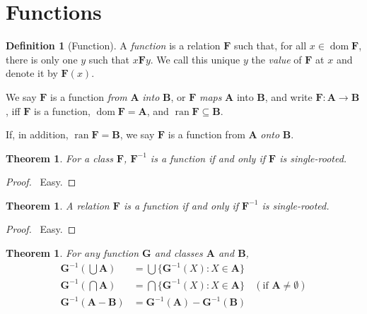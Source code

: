 \documentclass{article}
\let\qed\relax
\newtheorem{theorem}[axiom]{Theorem}
\theoremstyle{definition}
\newtheorem{definition}[axiom]{Definition}
\newcommand{\dom}{\ensuremath{\operatorname{dom}}}
\newcommand{\inv}[1]{\ensuremath{{#1}^{-1}}}
\newcommand{\ran}{\ensuremath{\operatorname{ran}}}
\begin{document}
    \section{Functions}

    \begin{definition}[Function]
        A \emph{function} is a relation $\mathbf{F}$ such that, for all $x \in \dom \mathbf{F}$,
        there is only one $y$ such that $x \mathbf{F} y$. We call this unique $y$ the \emph{value}
        of $\mathbf{F}$ at $x$ and denote it by $\mathbf{F}(x)$.

        We say $\mathbf{F}$ is a function \emph{from} $\mathbf{A}$ \emph{into} $\mathbf{B}$,
        or $\mathbf{F}$ \emph{maps} $\mathbf{A}$ into $\mathbf{B}$, and write $\mathbf{F} : \mathbf{A}
        \rightarrow \mathbf{B}$, iff $\mathbf{F}$ is a function, $\dom \mathbf{F} = \mathbf{A}$,
        and $\ran \mathbf{F} \subseteq \mathbf{B}$.

        If, in addition, $\ran \mathbf{F} = \mathbf{B}$, we say $\mathbf{F}$ is a function from $\mathbf{A}$
        \emph{onto} $\mathbf{B}$.
    \end{definition}

    \begin{theorem}
        For a class $\mathbf{F}$, $\inv{\mathbf{F}}$ is a function if and only if $\mathbf{F}$ is single-rooted.
    \end{theorem}

    \begin{proof}
        \pf\ Easy. \qed
    \end{proof}

    \begin{theorem}
        A relation $\mathbf{F}$ is a function if and only if $\inv{\mathbf{F}}$ is single-rooted.
    \end{theorem}

    \begin{proof}
        \pf\ Easy. \qed
    \end{proof}

    \begin{theorem}
        For any function $\mathbf{G}$ and classes $\mathbf{A}$ and $\mathbf{B}$,
        \begin{align*}
            \inv{\mathbf{G}}(\bigcup \mathbf{A}) & = \bigcup \{ \inv{\mathbf{G}}(X) : X \in \mathbf{A} \} \\
            \inv{\mathbf{G}}(\bigcap \mathbf{A}) & = \bigcap \{ \inv{\mathbf{G}}(X) : X \in \mathbf{A} \} &
            (\text{if } \mathbf{A} \neq \emptyset) \\
            \inv{\mathbf{G}}(\mathbf{A} - \mathbf{B}) & = \inv{\mathbf{G}}(\mathbf{A}) - \inv{\mathbf{G}}(\mathbf{B})
        \end{align*}
    \end{theorem}
\end{document}
